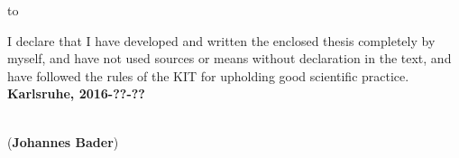 
\vspace*{33\baselineskip}
\hbox to \textwidth{\hrulefill}
\par
I declare that I have developed and written the enclosed thesis completely by myself, and have not used sources or means without declaration  in the text, and have followed the rules of the KIT for upholding good scientific practice.\\

\textbf{Karlsruhe, 2016-??-??}
\vspace{1.5cm}
 
\dotfill\hspace*{8.0cm}\\
\hspace*{2cm}(\textbf{Johannes Bader}) %

